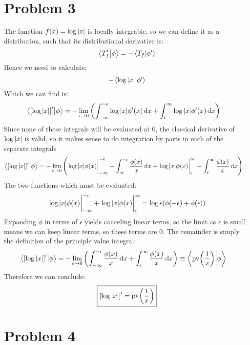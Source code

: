 \documentclass[12pt]{article}
\begin{document}
\section*{Problem 3}
The function $f(x)=\log\abs{x}$ is locally integrable, so we can define it as a distribution, such that its distributional derivative is:
\begin{align*}
  \ip{T_f'}{\phi}=-\ip{T_f}{\phi'}
\end{align*}
Hence we need to calculate:
\begin{align*}
  -\ip{\log\abs{x}}{\phi'}
\end{align*}
Which we can find is:
\begin{align*}
  \ip{\qty[\log\abs{x}]'}{\phi}&=-\lim_{\epsilon\to0}
  \qty(\int_{-\infty}^{-\epsilon}\log\abs{x}\phi'(x)\dd{x}
  +\int_\epsilon^\infty\log\abs{x}\phi'(x)\dd{x})
\end{align*}
Since none of these integrals will be evaluated at $0$, the classical derivative of $\log\abs{x}$ is valid, so it makes sense to do integration by parts in each of the separate integrals
\begin{align*}
  \ip{\qty[\log\abs{x}]'}{\phi}&=-\lim_{\epsilon\to0}
  \qty(
  \eval{\log\abs{x}\phi(x)}_{-\infty}^{-\epsilon}
  -\int_{\infty}^{-\epsilon}\frac{\phi(x)}{x}\dd{x}
  +\eval{\log\abs{x}\phi(x)}_\epsilon^\infty
  -\int_\epsilon^\infty\frac{\phi(x)}{x}\dd{x})
\end{align*}
The two functions which must be evaluated:
\begin{align*}
  \eval{\log\abs{x}\phi(x)}_{-\infty}^{-\epsilon}+
  \eval{\log\abs{x}\phi(x)}_\epsilon^\infty=
  \log\epsilon\qty(\phi(-\epsilon)+\phi(\epsilon))
\end{align*}
Expanding $\phi$ in terms of $\epsilon$ yields canceling linear terms, so the limit as $\epsilon$ is small means we can keep linear terms, so these terms are $0$. The remainder is simply the definition of the principle value integral:
\begin{align*}
  \ip{\qty[\log\abs{x}]'}{\phi}&=-\lim_{\epsilon\to0}
  \qty(\int_{-\infty}^{-\epsilon}\frac{\phi(x)}{x}\dd{x}+
  \int_{\epsilon}^{\infty}\frac{\phi(x)}{x}\dd{x})
  \equiv\ip{\mathrm{pv}\qty(\frac1x)}{\phi}
\end{align*}
Therefore we can conclude:
\begin{align}
  \boxed{
    \qty[\log\abs{x}]'=\mathrm{pv}\qty(\frac1x)
  }
\end{align}
\section*{Problem 4}
\end{document}
